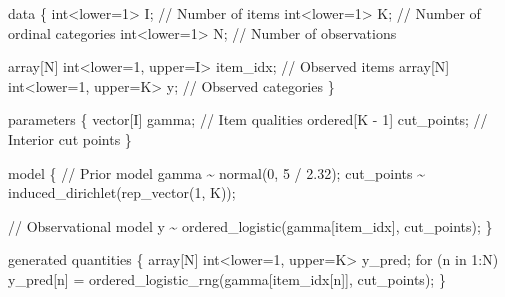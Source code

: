 \documentclass[
  letterpaper,
  DIV=11,
  numbers=noendperiod]{scrartcl}
\newenvironment{Shaded}{\begin{snugshade}}{\end{snugshade}}
\newcommand{\CommentTok}[1]{\textcolor[rgb]{0.37,0.37,0.37}{#1}}
\newcommand{\ControlFlowTok}[1]{\textcolor[rgb]{0.00,0.23,0.31}{#1}}
\newcommand{\DataTypeTok}[1]{\textcolor[rgb]{0.68,0.00,0.00}{#1}}
\newcommand{\DecValTok}[1]{\textcolor[rgb]{0.68,0.00,0.00}{#1}}
\newcommand{\FloatTok}[1]{\textcolor[rgb]{0.68,0.00,0.00}{#1}}
\newcommand{\KeywordTok}[1]{\textcolor[rgb]{0.00,0.23,0.31}{#1}}
\newcommand{\NormalTok}[1]{\textcolor[rgb]{0.00,0.23,0.31}{#1}}
\begin{document}
\begin{codelisting}
\begin{Shaded}
\begin{Highlighting}[]
\KeywordTok{data}\NormalTok{ \{}
  \DataTypeTok{int}\NormalTok{\textless{}}\KeywordTok{lower}\NormalTok{=}\DecValTok{1}\NormalTok{\textgreater{} I;                   }\CommentTok{// Number of items}
  \DataTypeTok{int}\NormalTok{\textless{}}\KeywordTok{lower}\NormalTok{=}\DecValTok{1}\NormalTok{\textgreater{} K;                   }\CommentTok{// Number of ordinal categories}
  \DataTypeTok{int}\NormalTok{\textless{}}\KeywordTok{lower}\NormalTok{=}\DecValTok{1}\NormalTok{\textgreater{} N;                   }\CommentTok{// Number of observations}

  \DataTypeTok{array}\NormalTok{[N] }\DataTypeTok{int}\NormalTok{\textless{}}\KeywordTok{lower}\NormalTok{=}\DecValTok{1}\NormalTok{, }\KeywordTok{upper}\NormalTok{=I\textgreater{} item\_idx; }\CommentTok{// Observed items}
  \DataTypeTok{array}\NormalTok{[N] }\DataTypeTok{int}\NormalTok{\textless{}}\KeywordTok{lower}\NormalTok{=}\DecValTok{1}\NormalTok{, }\KeywordTok{upper}\NormalTok{=K\textgreater{} y;        }\CommentTok{// Observed categories}
\NormalTok{\}}

\KeywordTok{parameters}\NormalTok{ \{}
  \DataTypeTok{vector}\NormalTok{[I] gamma;           }\CommentTok{// Item qualities}
  \DataTypeTok{ordered}\NormalTok{[K {-} }\DecValTok{1}\NormalTok{] cut\_points; }\CommentTok{// Interior cut points}
\NormalTok{\}}

\KeywordTok{model}\NormalTok{ \{}
  \CommentTok{// Prior model}
\NormalTok{  gamma \textasciitilde{} normal(}\DecValTok{0}\NormalTok{, }\DecValTok{5}\NormalTok{ / }\FloatTok{2.32}\NormalTok{);}
\NormalTok{  cut\_points \textasciitilde{} induced\_dirichlet(rep\_vector(}\DecValTok{1}\NormalTok{, K));}

  \CommentTok{// Observational model}
\NormalTok{  y \textasciitilde{} ordered\_logistic(gamma[item\_idx], cut\_points);}
\NormalTok{\}}

\KeywordTok{generated quantities}\NormalTok{ \{}
  \DataTypeTok{array}\NormalTok{[N] }\DataTypeTok{int}\NormalTok{\textless{}}\KeywordTok{lower}\NormalTok{=}\DecValTok{1}\NormalTok{, }\KeywordTok{upper}\NormalTok{=K\textgreater{} y\_pred;}
  \ControlFlowTok{for}\NormalTok{ (n }\ControlFlowTok{in} \DecValTok{1}\NormalTok{:N)}
\NormalTok{    y\_pred[n] = ordered\_logistic\_rng(gamma[item\_idx[n]], cut\_points);}
\NormalTok{\}}
\end{Highlighting}
\end{Shaded}

\end{codelisting}
\end{document}
